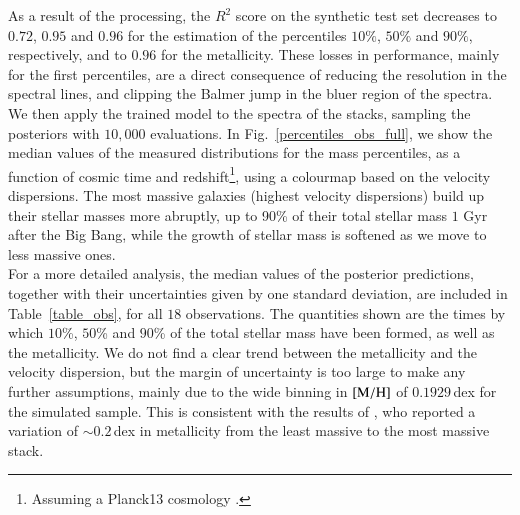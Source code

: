 As a result of the processing, the $R^2$ score on the synthetic test set decreases to $0.72$, $0.95$ and $0.96$ for the estimation of the percentiles $10\%$, $50\%$ and $90\%$, respectively, and to $0.96$ for the metallicity. These losses in performance, mainly for the first percentiles, are a direct consequence of reducing the resolution in the spectral lines, and clipping the Balmer jump in the bluer region of the spectra.\\




We then apply the trained model to the spectra of the stacks, sampling the posteriors with $10{,}000$ evaluations. In Fig.~\ref{percentiles_obs_full}, we show the median values of the measured distributions for the mass percentiles, as a function of cosmic time and redshift\footnote{Assuming a Planck13 cosmology \citep{planck13}.}, using a colourmap based on the velocity dispersions. The most massive galaxies (highest velocity dispersions) build up their stellar masses more abruptly, up to 90\% of their total stellar mass $1$ Gyr after the Big Bang, while the growth of stellar mass is softened as we move to less massive ones.\\ 

For a more detailed analysis, the median values of the posterior predictions, together with their uncertainties given by one standard deviation, are included in Table~\ref{table_obs}, for all $18$ observations. The quantities shown are the times by which $10$\%, $50$\% and $90$\% of the total stellar mass have been formed, as well as the metallicity. We do not find a clear trend between the metallicity and the velocity dispersion, but the margin of uncertainty is too large to make any further assumptions, mainly due to the wide binning in $\rm{[M/H]}$ of $0.1929$\,dex for the simulated sample. This is consistent with the results of \cite{La_Barbera_2013}, who reported a variation of $\sim 0.2$\,dex in metallicity from the least massive to the most massive stack.\\




